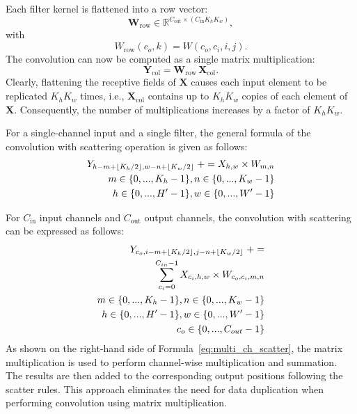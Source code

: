 Each filter kernel is flattened into a row vector:
\[
\mathbf{W}_{\mathrm{row}} 
\in 
\mathbb{R}^{C_{\mathrm{out}} \times (C_{\mathrm{in}} K_h K_w)},
\]
with
\[
W_{\mathrm{row}}(c_o,k)
=
W(c_o,c_i,i,j).
\]
The convolution can now be computed as a single matrix multiplication:
\[
\mathbf{Y}_{\mathrm{col}}
=
\mathbf{W}_{\mathrm{row}}\,
\mathbf{X}_{\mathrm{col}}.
\]
Clearly, flattening the receptive fields of $\mathbf{X}$ causes each input element to be replicated \(K_h K_w\) times, i.e.,
$\mathbf{X}_{\mathrm{col}}$ contains up to $K_h K_w$ copies of each element of $\mathbf{X}$. 
Consequently, the number of multiplications increases by a factor of \(K_h K_w\).


For a single-channel input and a single filter, 
the general formula of the convolution with scattering operation is given as follows: 
\begin{equation}
\begin{split}
Y_{h - m +  \lfloor K_h/2\rfloor, w - n + \lfloor K_w /2\rfloor} \; += X_{h,w} \times W_{m, n} \\
m \in \{0, ..., K_h-1\}, n \in \{0, ..., K_w-1\} \\
h  \in \{0,  ...,H'-1\}, w  \in \{0, ...,W'-1\}\\
\end{split}
\end{equation}

For $C_{\mathrm{in}}$ input channels and $C_{\mathrm{out}}$ output channels, the convolution with scattering can be expressed as follows: 
\begin{equation}
\label{eq:multi_ch_scatter}
\begin{split}
Y_{c_{o}, i - m +  \lfloor K_h/2\rfloor, j - n + \lfloor K_w /2\rfloor} \; += \\
\sum_{c_i=0} ^{C_{in}-1}{X_{c_{i}, h,w} \times W_{c_{o}, c_{i}, m, n}} \\
m \in \{0, ..., K_h-1\}, n \in \{0, ..., K_w-1\} \\
h  \in \{0,  ...,H'-1\}, w  \in \{0, ...,W'-1\}\\
c_o  \in \{0,...,C_{out}-1\}
\end{split}
\end{equation}
As shown on the right-hand side of Formula~\eqref{eq:multi_ch_scatter}, the matrix multiplication is used to perform channel-wise multiplication and summation. 
The results are then added to the corresponding output positions following the scatter rules.
This approach eliminates the need for data duplication when performing convolution using matrix multiplication.

